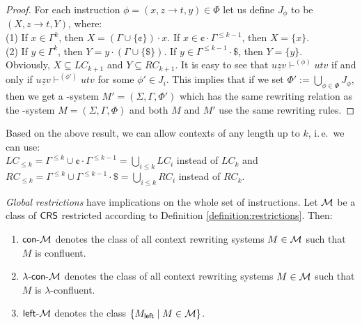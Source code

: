 \begin{proof}
For each instruction $\phi = (x, z \to t, y) \in \Phi$ let us define $J_{\phi}$ to be $(X, z \to t, Y)$, where:\\
(1) \quad If $x \in \Gamma^k$, then $X = (\Gamma \cup \{ \cent \}) \cdot x$. If $x \in \cent \cdot \Gamma^{\le k-1}$, then $X = \{ x \}$.\\
(2) \quad If $y \in \Gamma^k$, then $Y = y \cdot (\Gamma \cup \{ \$ \})$. If $y \in \Gamma^{\le k-1}\cdot\$ $, then $Y = \{ y \}$.\\
Obviously, $X \subseteq LC_{k+1}$ and $Y \subseteq RC_{k+1}$.
It is easy to see that $u \underline{z} v \vdash^{(\phi)} utv$ if and only if $u \underline{z} v \vdash^{(\phi')} utv$ for some $\phi' \in J_i$. This implies that if we set $\Phi' := \bigcup_{\phi \in \Phi}{J_{\phi}}$, then we get a \kCRS[(k+1)]-system $M'=(\Sigma, \Gamma, \Phi')$ which has the same rewriting relation as the \kCRS[k]-system $M=(\Sigma, \Gamma, \Phi)$ and both $M$ and $M'$ use the same rewriting rules.
\end{proof}

\begin{remark}
Based on the above result, we can allow contexts of any length up to $k$, i.\,e.\ we can use:\\
\indent $LC_{\le k} = \Gamma^{\le k} \cup \cent \cdot \Gamma^{\le k-1} = \bigcup_{i \le k} LC_i$ instead of $LC_k$ and\\
\indent $RC_{\le k} = \Gamma^{\le k} \cup \Gamma^{\le k-1} \cdot \$ = \bigcup_{i \le k} RC_i$ instead of $RC_k$.
\end{remark}

\begin{definition}\label{definition:restrictions-global}
\emph{Global restrictions} have implications on the whole set of instructions. Let $\textup{\sf $\mathcal{M}$}$ be a class of $\textup{\sf CRS\/}$ restricted according to Definition \ref{definition:restrictions}. Then:
\begin{enumerate}
\item\label{restriction:conf}
$\textup{\sf con-\textup{\sf $\mathcal{M}$}}$ denotes the class of all context rewriting systems $M \in \textup{\sf $\mathcal{M}$}$ such that $M$ is confluent.

\item\label{restriction:lambda}
$\textup{\sf $\lambda$-con-\textup{\sf $\mathcal{M}$}}$ denotes the class of all context rewriting systems $M \in \textup{\sf $\mathcal{M}$}$ such that $M$ is $\lambda$-confluent.

\item\label{restriction:left}
$\textup{\sf left-\textup{\sf $\mathcal{M}$}}$ denotes the class $\{M_{\sf left} \mid M \in \textup{\sf $\mathcal{M}$}\}$.
\end{enumerate}
\end{definition}

